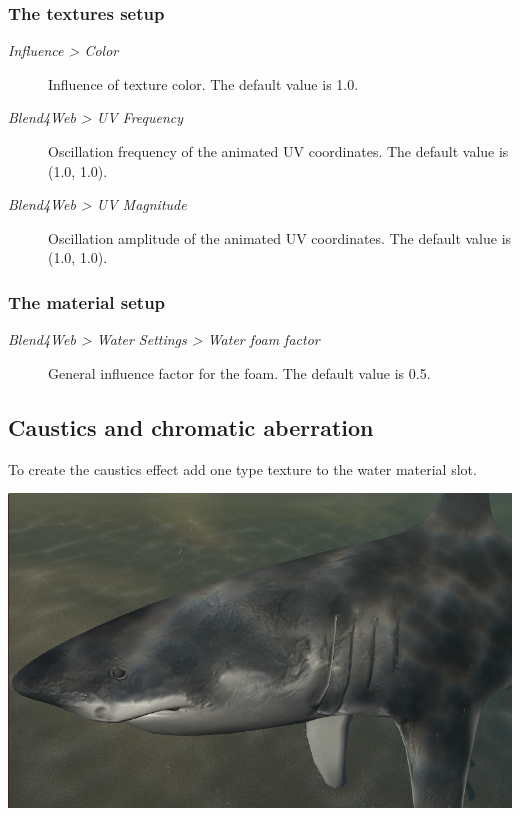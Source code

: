 \documentclass[a4paper,12pt,oneside]{sphinxmanual}
\begin{document}
\subsubsection{The textures setup}
\label{outdoor_rendering:id13}\begin{description}
\item[{\emph{Influence \textgreater{} Color}}] \leavevmode
Influence of texture color. The default value is 1.0.

\item[{\emph{Blend4Web \textgreater{} UV Frequency}}] \leavevmode
Oscillation frequency of the animated UV coordinates. The default value is (1.0, 1.0).

\item[{\emph{Blend4Web \textgreater{} UV Magnitude}}] \leavevmode
Oscillation amplitude of the animated UV coordinates. The default value is (1.0, 1.0).

\end{description}


\subsubsection{The material setup}
\label{outdoor_rendering:id14}\begin{description}
\item[{\emph{Blend4Web \textgreater{} Water Settings \textgreater{} Water foam factor}}] \leavevmode
General influence factor for the foam. The default value is 0.5.

\end{description}


\subsection{Caustics and chromatic aberration}
\label{outdoor_rendering:id15}
To create the caustics effect add one  type texture to the water material slot.

{\hfill\includegraphics[width=1.000\linewidth]{water_caustics.jpg}\hfill}
\end{document}
